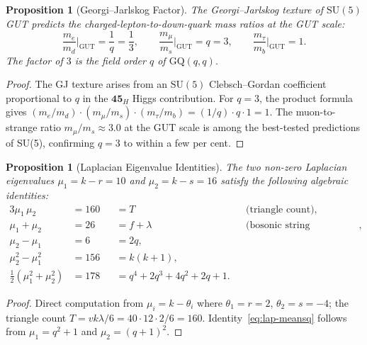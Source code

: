 \documentclass[12pt,a4paper]{article}
\newtheorem{proposition}[theorem]{Proposition}
\begin{document}
\begin{proposition}[Georgi--Jarlskog Factor]\label{prop:gj}
The Georgi--Jarlskog texture of $\mathrm{SU}(5)$ GUT predicts the
charged-lepton-to-down-quark mass ratios at the GUT scale:
\[
  \frac{m_e}{m_d}\bigg|_{\mathrm{GUT}} = \frac{1}{q} = \frac{1}{3},
  \qquad
  \frac{m_\mu}{m_s}\bigg|_{\mathrm{GUT}} = q = 3,
  \qquad
  \frac{m_\tau}{m_b}\bigg|_{\mathrm{GUT}} = 1.
\]
The factor of $3$ is the field order $q$ of $\mathrm{GQ}(q,q)$.
\end{proposition}

\begin{proof}
The GJ texture arises from an $\mathrm{SU}(5)$ Clebsch--Gordan
coefficient proportional to $q$ in the $\mathbf{45}_H$ Higgs
contribution.  For $q = 3$, the product formula gives
$(m_e/m_d)\cdot(m_\mu/m_s)\cdot(m_\tau/m_b) = (1/q)\cdot q\cdot 1 = 1$.
The muon-to-strange ratio $m_\mu/m_s \approx 3.0$ at the GUT scale
is among the best-tested predictions of SU(5),
confirming $q = 3$ to within a few per cent.
\end{proof}


\begin{proposition}[Laplacian Eigenvalue Identities]\label{prop:laplacian-id}
The two non-zero Laplacian eigenvalues
$\mu_1 = k - r = 10$ and $\mu_2 = k - s = 16$
satisfy the following algebraic identities:
\begin{alignat}{3}
  \mu_1\,\mu_2 &= 160  &&= T \quad &&\text{(triangle count)}, \label{eq:lap-prod}\\
  \mu_1 + \mu_2 &= 26 &&= f + \lambda \quad &&\text{(bosonic string dimension)}, \label{eq:lap-sum}\\
  \mu_2 - \mu_1 &= 6 &&= 2q, \label{eq:lap-diff}\\
  \mu_2^2 - \mu_1^2 &= 156 &&= k(k+1), \label{eq:lap-diffsq}\\
  \tfrac{1}{2}(\mu_1^2 + \mu_2^2) &= 178 &&= q^4{+}2q^3{+}4q^2{+}2q{+}1.
    \label{eq:lap-meansq}
\end{alignat}
\end{proposition}

\begin{proof}
Direct computation from $\mu_i = k - \theta_i$ where
$\theta_1 = r = 2$, $\theta_2 = s = -4$;
the triangle count $T = vk\lambda/6 = 40\cdot12\cdot2/6 = 160$.
Identity~\eqref{eq:lap-meansq} follows from
$\mu_1 = q^2+1$ and $\mu_2 = (q+1)^2$.
\end{proof}
\end{document}
